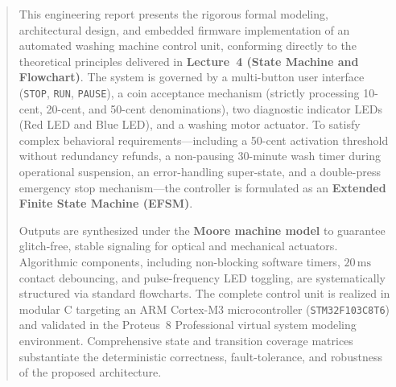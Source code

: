 \documentclass[12pt]{article}
\begin{document}
\clearpage
\pagestyle{fancy}
\renewcommand{\headrulewidth}{0.4pt}
\fancyfoot[C]{}

\begin{abstract}
This engineering report presents the rigorous formal modeling, architectural design, and embedded firmware implementation of an automated washing machine control unit, conforming directly to the theoretical principles delivered in \textbf{Lecture~4 (State Machine and Flowchart)}. The system is governed by a multi-button user interface (\texttt{STOP}, \texttt{RUN}, \texttt{PAUSE}), a coin acceptance mechanism (strictly processing 10-cent, 20-cent, and 50-cent denominations), two diagnostic indicator LEDs (Red LED and Blue LED), and a washing motor actuator. To satisfy complex behavioral requirements—including a 50-cent activation threshold without redundancy refunds, a non-pausing 30-minute wash timer during operational suspension, an error-handling super-state, and a double-press emergency stop mechanism—the controller is formulated as an \textbf{Extended Finite State Machine (EFSM)}. 

Outputs are synthesized under the \textbf{Moore machine model} to guarantee glitch-free, stable signaling for optical and mechanical actuators. Algorithmic components, including non-blocking software timers, $20\,\text{ms}$ contact debouncing, and pulse-frequency LED toggling, are systematically structured via standard flowcharts. The complete control unit is realized in modular C targeting an ARM Cortex-M3 microcontroller (\texttt{STM32F103C8T6}) and validated in the Proteus~8 Professional virtual system modeling environment. Comprehensive state and transition coverage matrices substantiate the deterministic correctness, fault-tolerance, and robustness of the proposed architecture.
\end{abstract}

\vspace{0.8cm}
\tableofcontents
\newpage

\setcounter{page}{1}

\end{document}
